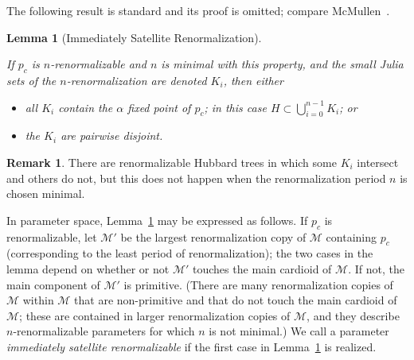 \documentclass[12pt]{amsart}
\newcommand{\M}{\mathscr M}
\newcommand{\0}{\texttt{0}}
\newcommand{\1}{\texttt{1}}
\newtheorem{lemma}[theorem]{Lemma}
\theoremstyle{definition}
\newtheorem*{remark}{Remark}
\numberwithin{equation}{section}
\newcommand{\lineclear}{\rule{0pt}{2pt}\newline}
\begin{document}

The following result is standard and its proof is omitted; compare McMullen~\cite[Sec.~7]{McMullenRenormalization}.
\begin{lemma}[Immediately Satellite Renormalization]
\label{Lem:RenormMinimalPeriod} \lineclear
If $p_c$ is $n$-renormalizable and $n$ is minimal with this property, and the small Julia sets of the $n$-renormalization are denoted $K_i$, 
then either
\begin{itemize}
\item all $K_i$ contain the $\alpha$ fixed point of $p_c$; in this case $H\subset \bigcup_{i=0}^{n-1}K_i$; or
\item the $K_i$ are pairwise disjoint. 
\end{itemize}
\end{lemma}
\begin{remark}
There are renormalizable Hubbard trees in which some $K_i$ intersect and others do not, but this does not happen when the renormalization period $n$ is chosen minimal. 

In parameter space, Lemma~\ref{Lem:RenormMinimalPeriod} may be expressed as follows. If $p_c$ is renormalizable,  let $\M'$ be the largest renormalization copy of $\M$ containing $p_c$ (corresponding to the least period of \mbox{renormalization}); the two cases in the lemma depend on whether or not $\M'$ touches the main cardioid of $\M$. If not,  the main component of $\M'$ is primitive. (There are many renormalization copies of $\M$ within $\M$ that are non-primitive and that do not touch the main cardioid of $\M$; these are contained in larger renormalization copies of $\M$, and they describe $n$-renormalizable parameters for which $n$ is not minimal.) We call a parameter \emph{immediately satellite renormalizable} if the first case in Lemma~\ref{Lem:RenormMinimalPeriod}
is realized.
\end{remark}
\end{document}
